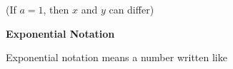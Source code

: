 \begin{description}
\begin{description}
        
        (If \begin{math}a=1\end{math}, then \begin{math}x\end{math} and \begin{math}y\end{math} can differ)
        \\\end{description}

	    \item[] \noindent\raggedright {\bf  Exponential Notation }\\\begin{description}\item{\hspace{.3cm}}\hspace{.3cm}
      \label{m38359*id62672}Exponential notation means a number written like\par 
      \label{m38359*id62677}\nopagebreak\noindent{}
    

\end{description}
\end{description}

